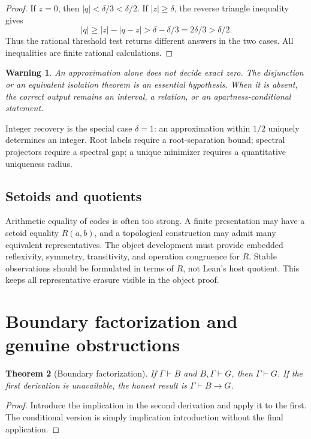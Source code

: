 \documentclass[11pt]{article}
\newtheorem{theorem}{Theorem}[section]
\newtheorem{warning}[theorem]{Warning}
\begin{document}
\begin{proof}
If \(z=0\), then \(|q|<\delta/3<\delta/2\).  If
\(|z|\ge\delta\), the reverse triangle inequality gives
\[
  |q|\ge |z|-|q-z|>\delta-\delta/3=2\delta/3>\delta/2.
\]
Thus the rational threshold test returns different answers in the two cases.
All inequalities are finite rational calculations.
\end{proof}

\begin{warning}
An approximation alone does not decide exact zero.  The disjunction or an
equivalent isolation theorem is an essential hypothesis.  When it is absent,
the correct output remains an interval, a relation, or an apartness-conditional
statement.
\end{warning}

Integer recovery is the special case \(\delta=1\): an approximation within
\(1/2\) uniquely determines an integer.  Root labels require a root-separation
bound; spectral projectors require a spectral gap; a unique minimizer requires
a quantitative uniqueness radius.

\subsection{Setoids and quotients}

Arithmetic equality of codes is often too strong.  A finite presentation may
have a setoid equality \(R(a,b)\), and a topological construction may admit
many equivalent representatives.  The object development must provide
embedded reflexivity, symmetry, transitivity, and operation congruence for
\(R\).  Stable observations should be formulated in terms of \(R\), not Lean's
host quotient.  This keeps all representative erasure visible in the object
proof.

\section{Boundary factorization and genuine obstructions}
\label{sec:boundary}

\begin{theorem}[Boundary factorization]
\label{thm:boundary}
If \(\Gamma\vdash B\) and \(B,\Gamma\vdash G\), then
\(\Gamma\vdash G\).  If the first derivation is unavailable, the honest result
is \(\Gamma\vdash B\to G\).
\end{theorem}

\begin{proof}
Introduce the implication in the second derivation and apply it to the first.
The conditional version is simply implication introduction without the final
application.
\end{proof}
\end{document}
